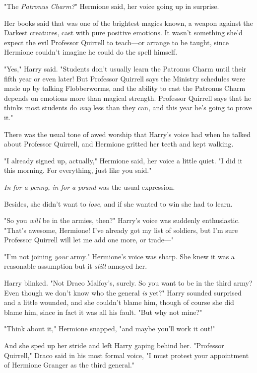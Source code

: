 "The \emph{Patronus Charm?}" Hermione said, her voice going up in surprise.

Her books said that was one of the brightest magics known, a weapon against the
Darkest creatures, cast with pure positive emotions. It wasn't something she'd
expect the evil Professor Quirrell to teach---or arrange to be taught, since
Hermione couldn't imagine he could do the spell himself.

"Yes," Harry said. "Students don't usually learn the Patronus Charm until their
fifth year or even later! But Professor Quirrell says the Ministry schedules
were made up by talking Flobberworms, and the ability to cast the Patronus
Charm depends on emotions more than magical strength. Professor Quirrell says
that he thinks most students do \emph{way} less than they can, and this year
he's going to prove it."

There was the usual tone of awed worship that Harry's voice had when he talked
about Professor Quirrell, and Hermione gritted her teeth and kept walking.

"I already signed up, actually," Hermione said, her voice a little quiet. "I
did it this morning. For everything, just like you said."

\emph{In for a penny, in for a pound} was the usual expression.

Besides, she didn't want to \emph{lose}, and if she wanted to win she had to
learn.

"So you \emph{will} be in the armies, then?" Harry's voice was suddenly
enthusiastic. "That's awesome, Hermione! I've already got my list of
soldiers, but I'm sure Professor Quirrell will let me add one more, or trade---"

"I'm not joining \emph{your} army." Hermione's voice was sharp. She knew it was
a reasonable assumption but it \emph{still} annoyed her.

Harry blinked. "Not Draco Malfoy's, surely. So you want to be in the third
army? Even though we don't know who the general \emph{is} yet?" Harry sounded
surprised and a little wounded, and she couldn't blame him, though of course
she did blame him, since in fact it was all his fault. "But why not mine?"

"Think about it," Hermione snapped, "and maybe you'll work it out!"

And she sped up her stride and left Harry gaping behind her.
\later
"Professor Quirrell," Draco said in his most formal voice, "I must protest your
appointment of Hermione Granger as the third general."

